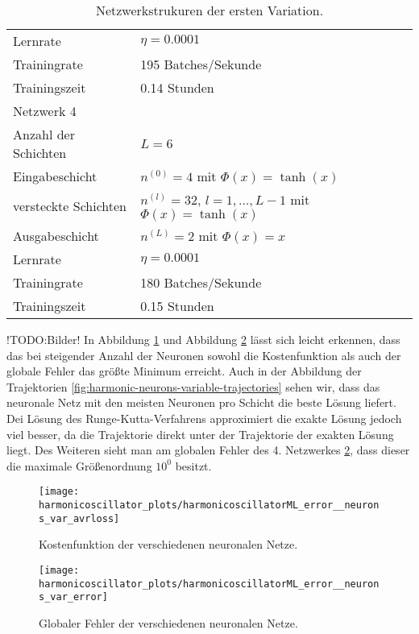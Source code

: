 \begin{table}
\begin{tabular}{ l | l }
              Lernrate & $\eta=0.0001$ \\
              Trainingrate & 195 Batches/Sekunde \\
              Trainingszeit & 0.14 Stunden \\
              \hline
              Netzwerk 4 & \\
              \hline
              Anzahl der Schichten & $L=6$ \\
              Eingabeschicht & $n^{(0)}=4$ mit $\Phi(x)=\tanh(x)$ \\
              versteckte Schichten & $n^{(l)}=32$, $l = 1, \dots, L-1$ mit $\Phi(x)=\tanh(x)$ \\
              Ausgabeschicht & $n^{(L)}=2$ mit $\Phi(x)=x$ \\
              Lernrate & $\eta=0.0001$ \\
              Trainingrate & 180 Batches/Sekunde \\
              Trainingszeit & 0.15 Stunden \\
              \hline
       \end{tabular}
       \caption{Netzwerkstrukuren der ersten Variation.}
       \label{stiff-table-first}
\end{table}
!TODO:Bilder!
In Abbildung \ref{fig:harmonic-neurons-variable-loss} und Abbildung \ref{fig:harmonic-neurons-variable-error} lässt
sich leicht erkennen, dass das bei steigender Anzahl der Neuronen sowohl die Kostenfunktion als auch der globale Fehler
das größte Minimum erreicht. Auch in der Abbildung der Trajektorien \ref{fig:harmonic-neurons-variable-trajectories}
sehen wir, dass das neuronale Netz mit den meisten Neuronen pro Schicht die beste Lösung liefert. Dei Lösung des
Runge-Kutta-Verfahrens approximiert die exakte Lösung jedoch viel besser, da die Trajektorie direkt unter der
Trajektorie der exakten Lösung liegt. Des Weiteren sieht man am globalen Fehler des 4. Netzwerkes
\ref{fig:harmonic-neurons-variable-error}, dass dieser die maximale Größenordnung $10^0$ besitzt.
\begin{figure}
       \centering
       \texttt{[image: harmonicoscillator\_plots/harmonicoscillatorML\_error\_\_neurons\_var\_avrloss]}
       \caption{Kostenfunktion der verschiedenen neuronalen Netze.}
       \label{fig:harmonic-neurons-variable-loss}
\end{figure}
\begin{figure}
       \centering
       \texttt{[image: harmonicoscillator\_plots/harmonicoscillatorML\_error\_\_neurons\_var\_error]}
       \caption{Globaler Fehler der verschiedenen neuronalen Netze.}
       \label{fig:harmonic-neurons-variable-error}
\end{figure}
